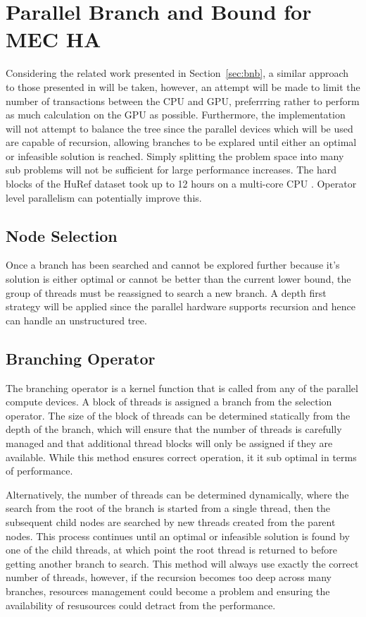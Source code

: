 \documentclass[10pt,twocolumn]{witseiepaper}
\begin{document}
\section{ Parallel Branch and Bound for MEC HA } \label{sec:parbnb}

Considering the related work presented in Section~\ref{sec:bnb}, a similar approach to those presented in
\cite{melab:2012, chakroun:2012, chakroun:2013} will be taken, however, an attempt will be made to limit the
number of transactions between the CPU and GPU, preferrring rather to perform as much calculation on the GPU
as possible. Furthermore, the implementation will not attempt to balance the tree since the parallel devices
which will be used are capable of recursion, allowing branches to be explared until either an optimal or
infeasible solution is reached. Simply splitting the problem space into many sub problems will not be
sufficient for large performance increases. The hard blocks of the HuRef dataset took up to 12 hours on a
multi-core CPU \cite{chen:2013}. Operator level parallelism can potentially improve this.

\subsection{Node Selection}

Once a branch has been searched and cannot be explored further because it's solution is either optimal or
cannot be better than the current lower bound, the group of threads must be reassigned to search a new branch.
A depth first strategy will be applied since the parallel hardware supports recursion and hence can handle an
unstructured tree.

\subsection{Branching Operator}

The branching operator is a kernel function that is called from any of the parallel compute devices. A block
of threads is assigned a branch from the selection operator. The size of the block of threads can be
determined statically from the depth of the branch, which will ensure that the number of threads is carefully
managed and that additional thread blocks will only be assigned if they are available. While this method
ensures correct operation, it it sub optimal in terms of performance. 

Alternatively, the number of threads can be determined dynamically, where the search from the root of the
branch is started from a single thread, then the subsequent child nodes are searched by new threads created
from the parent nodes. This process continues until an optimal or infeasible solution is found by one of the
child threads, at which point the root thread is returned to before getting another branch to search. This
method will always use exactly the correct number of threads, however, if the recursion becomes too deep
across many branches, resources management could become a problem and ensuring the availability of resusources
could detract from the performance.
\end{document}
